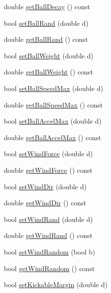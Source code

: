 \begin{DoxyCompactItemize}
double \hyperlink{classServerSettings_a3c15233bbc1e27407eb4bbced64477ad}{get\+Ball\+Decay} () const 
\item 
bool \hyperlink{classServerSettings_a5521e9611b2b224a8e45de337e08cc1d}{set\+Ball\+Rand} (double d)
\item 
double \hyperlink{classServerSettings_a96f93df70f291091044472f9d8398830}{get\+Ball\+Rand} () const 
\item 
bool \hyperlink{classServerSettings_aa8a24da8ae915af2fe8e5b67caefe984}{set\+Ball\+Weight} (double d)
\item 
double \hyperlink{classServerSettings_a7f5f0af2958dbc1d4d17a3d02a794f0e}{get\+Ball\+Weight} () const 
\item 
bool \hyperlink{classServerSettings_a6c7f2ea1d031c9af863ace3a18828448}{set\+Ball\+Speed\+Max} (double d)
\item 
double \hyperlink{classServerSettings_ac8b10c7247665386f572ca9ba658f985}{get\+Ball\+Speed\+Max} () const 
\item 
bool \hyperlink{classServerSettings_a5365e824cf6d761502443a7770d1f9b6}{set\+Ball\+Accel\+Max} (double d)
\item 
double \hyperlink{classServerSettings_a6f49060f4bf6ef0266e79fb28ad9141d}{get\+Ball\+Accel\+Max} () const 
\item 
bool \hyperlink{classServerSettings_a2ada3aeab1c4fc1317190ec9dbc9597f}{set\+Wind\+Force} (double d)
\item 
double \hyperlink{classServerSettings_acf7612afc222e0d244690b3d90951db6}{get\+Wind\+Force} () const 
\item 
bool \hyperlink{classServerSettings_a34644737c9e70c800eda6af9c2b0b3b2}{set\+Wind\+Dir} (double d)
\item 
double \hyperlink{classServerSettings_a682881806da54a4592b55590bcd0be45}{get\+Wind\+Dir} () const 
\item 
bool \hyperlink{classServerSettings_affcdec56bd3bd90d8fe9363e202eba01}{set\+Wind\+Rand} (double d)
\item 
double \hyperlink{classServerSettings_a36d659107a6d0436172e8cee9675035d}{get\+Wind\+Rand} () const 
\item 
bool \hyperlink{classServerSettings_a040608ab561de21a0554d4ecd8bb37d5}{set\+Wind\+Random} (bool b)
\item 
bool \hyperlink{classServerSettings_a4d31b98048b26c549b79f7424a51ea02}{get\+Wind\+Random} () const 
\item 
bool \hyperlink{classServerSettings_a08aec4e5cc2d54619e0821b52394670b}{set\+Kickable\+Margin} (double d)

\end{DoxyCompactItemize}
